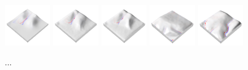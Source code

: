 \documentclass[prodmode,acmtochi]{acmsmall} %
\begin{document}
\begin{figure}[h!]
\begin{center}
		\includegraphics[width=0.18\textwidth]{images/render_3d/mean_depth_difference_1.png}
		\includegraphics[width=0.18\textwidth]{images/render_3d/mean_depth_difference_2.png}
		\includegraphics[width=0.18\textwidth]{images/render_3d/mean_depth_difference_3.png}
		\includegraphics[width=0.18\textwidth]{images/render_3d/mean_depth_difference_4.png}
		\includegraphics[width=0.18\textwidth]{images/render_3d/mean_depth_difference_5.png}
	\caption{...}
	\label{fig:}
\end{center}
\end{figure}


\end{document}
